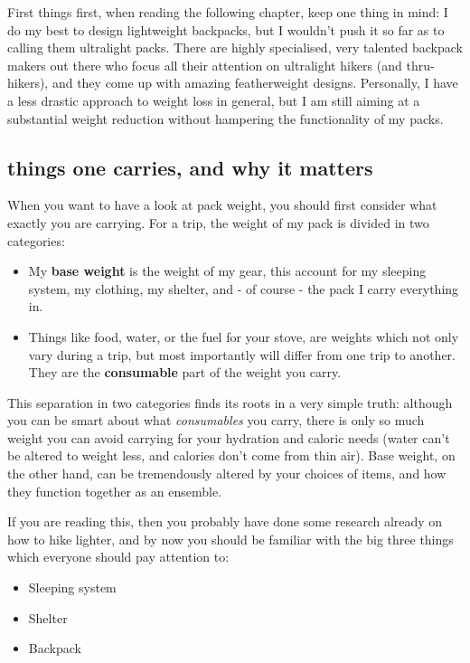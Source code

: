 First things first, when reading the following chapter, keep one thing in mind: I do my best to design lightweight backpacks, but I wouldn't push it so far as to calling them ultralight packs. There are highly specialised, very talented backpack makers out there who focus all their attention on ultralight hikers (and thru-hikers),  and they come up with amazing featherweight designs. Personally, I have a less drastic approach to weight loss in general, but I am still aiming at a substantial weight reduction without hampering the functionality of my packs.

\subsection{things one carries, and why it matters}

When you want to have a look at pack weight, you should first consider what exactly you are carrying. For a trip, the weight of my pack is divided in two categories:

\begin{itemize}

	\item My \textbf{base weight} is the weight of my gear, this account for my sleeping system, my clothing, my shelter, and - of course - the pack I carry everything in.

	\item Things like food, water, or the fuel for your stove, are weights which not only vary during a trip, but most importantly will differ from one trip to another. They are the \textbf{consumable} part of the weight you carry.

\end{itemize}

This separation in two categories finds its roots in a very simple truth: although you can be smart about what \textit{consumables} you carry, there is only so much weight you can avoid carrying  for your hydration and caloric needs (water can't be altered to weight less, and calories don't come from thin air). Base weight, on the other hand, can be tremendously altered by your choices of items, and how they function together as an ensemble.

If you are reading this, then you probably have done some research already on how to hike lighter, and by now you should be familiar with the big three things which everyone should pay attention to:

\begin{itemize}

	\item Sleeping system
	\item Shelter
	\item Backpack

\end{itemize}

